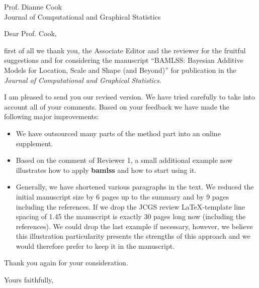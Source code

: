 \documentclass[foldmark,english]{uibkletter}
\begin{document}
\begin{letter}{Prof. Dianne Cook\\ Journal of Computational and Graphical Statistics}

\opening{Dear Prof. Cook,}

first of all we thank you, the Associate Editor and the reviewer for the fruitful suggestions
and for considering the manuscript ``BAMLSS: Bayesian Additive Models for
Location, Scale and Shape (and Beyond)'' for publication in the \emph{Journal of Computational and
Graphical Statistics}.

I am pleased to send you our revised version. We have tried carefully to take into account all of
your comments. Based on your feedback we have made the following major improvements:
\begin{itemize}
\item We have outsourced many parts of the method part into an online supplement.
\item Based on the comment of Reviewer 1, a small additional example now illustrates how to
  apply \textbf{bamlss} and how to start using it.
\item Generally, we have shortened various paragraphs in the text. We reduced the
  initial manuscript size by 6 pages up to the summary and by 9 pages including the references. If
  we drop the JCGS review \LaTeX-template line spacing of 1.45 the manuscript is exactly 30 pages
  long now (including the references). We could drop the last example if necessary, however, we
  believe this illustration particularity presents the strengths of this approach and we would
  therefore prefer to keep it in the manuscript.
\end{itemize}

Thank you again for your consideration.

\closing{Yours faithfully,}

\end{letter}
\end{document}
